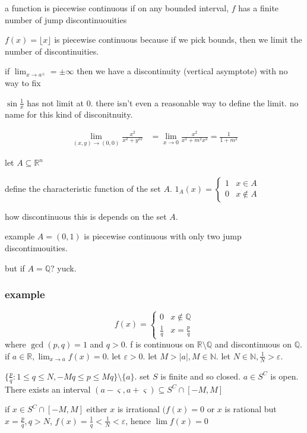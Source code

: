 \documentclass[letterpaper]{article}
\begin{document}
a function is piecewise continuous if on any  bounded interval, $f$ has a finite number of jump discontinuouities

$f(x)=\lfloor x\rfloor$ is piecewise continuous because if we pick bounds, then we limit the number of discontinuities.

if $\lim_{x\to a^\pm}=\pm\infty$ then we have a discontinuity (vertical asymptote) with no way to fix

$\sin \frac{1}{x}$ has not limit at 0. there isn't even a reasonable way to define the limit. no name for this kind of disconitnuity.

\begin{align*}
  \lim_{(x,y)\to(0,0)} \frac{x^2}{x^2+y^22}&=\lim_{x\to 0}\frac{x^2}{x^2+m^2x^2}=\frac{1}{1+m^2}
\end{align*}

  let $A\subseteq \mathbb{R}^n$

  define the characteristic function of the set $A$.
  $1_A(x)=\begin{cases}1&x\in A\\0& x\not\in A\end{cases}$

  how discontinuous this is depends on the set $A$.

  example $A=(0,1)$ is piecewise continuous with only two jump discontinuouities.

  but if $A=\mathbb{Q}$? yuck.

\subsubsection*{example}
\[f(x)=\begin{cases}0&x\not\in \mathbb{Q}\\\frac{1}{q}&x=\frac{p}{q}\end{cases}\]
where $\gcd(p,q)=1$ and $q>0$. f is continuous on $\mathbb{R}\setminus \mathbb{Q}$ and discontinuous on $\mathbb{Q}$.  if $a\in \mathbb{R}, \lim_{x\to a}f(x)=0$. let $\varepsilon>0$. let $M>|a|, M\in \mathbb{N}$. let $N\in \mathbb{N}, \frac{1}{N}>\varepsilon$. 

$\{\frac{p}{q}:1\le q\le N,-Mq\le p\le Mq\}\setminus \{a\}$. set $S$ is finite and so closed. $a\in S^C$ is open. There exists an interval  $(a-\varsigma,a+\varsigma)\subseteq S^C\cap[-M,M]$

if $x\in S^C\cap[-M,M]$ either $x$ is irrational $(f(x)=0$ or $x$ is rational but $x=\frac{p}{q},q>N$, $f(x)=\frac{1}{q}<\frac{1}{N}<\varepsilon$, hence $\lim f(x)=0$
\end{document}
